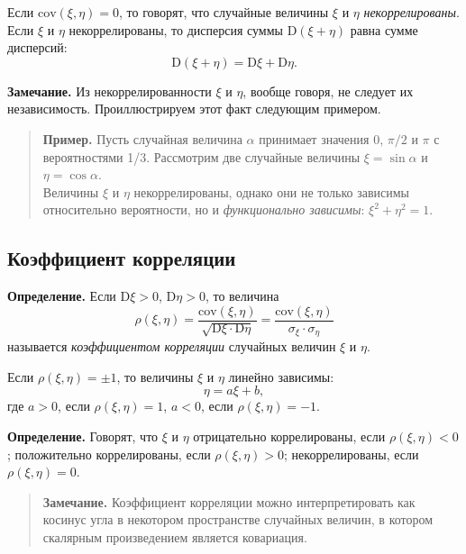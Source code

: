 \documentclass[11pt,a4paper]{article}
\begin{document}
Если \(\mathrm{cov}\left( \xi, \eta \right) = 0\), то говорят, что
случайные величины \(\xi\) и \(\eta\) \emph{некоррелированы}.\\
Если \(\xi\) и \(\eta\) некоррелированы, то дисперсия суммы
\(\mathrm{D}(\xi+\eta)\) равна сумме дисперсий:
\[ \mathrm{D}(\xi+\eta) = \mathrm{D}\xi + \mathrm{D}\eta. \]

\textbf{Замечание.} Из некоррелированности \(\xi\) и \(\eta\), вообще
говоря, не следует их независимость. Проиллюстрируем этот факт следующим
примером.

\begin{quote}
\textbf{Пример.} Пусть случайная величина \(\alpha\) принимает значения
0, \(\pi/2\) и \(\pi\) с вероятностями 1/3. Рассмотрим две случайные
величины \(\xi = \sin \alpha\) и \(\eta = \cos \alpha\).\\
Величины \(\xi\) и \(\eta\) некоррелированы, однако они не только
зависимы относительно вероятности, но и \emph{функционально зависимы}:
\(\xi^2 + \eta^2 = 1\).
\end{quote}

    \hypertarget{ux43aux43eux44dux444ux444ux438ux446ux438ux435ux43dux442-ux43aux43eux440ux440ux435ux43bux44fux446ux438ux438}{%
\subsection{Коэффициент
корреляции}\label{ux43aux43eux44dux444ux444ux438ux446ux438ux435ux43dux442-ux43aux43eux440ux440ux435ux43bux44fux446ux438ux438}}

\textbf{Определение.} Если \(\mathrm{D}\xi > 0\),
\(\mathrm{D}\eta > 0\), то величина \[
    \rho(\xi, \eta) = \dfrac{\mathrm{cov}(\xi, \eta)}{\sqrt{\mathrm{D}\xi \cdot \mathrm{D}\eta}} = \dfrac{\mathrm{cov}(\xi, \eta)}{\sigma_\xi \cdot \sigma_\eta}
\] называется \emph{коэффициентом корреляции} случайных величин \(\xi\)
и \(\eta\).

Если \(\rho(\xi, \eta) = \pm 1\), то величины \(\xi\) и \(\eta\) линейно
зависимы: \[ \eta =a \xi + b, \] где \(a>0\), если
\(\rho(\xi, \eta) = 1\), \(a<0\), если \(\rho(\xi, \eta) = -1\).

\textbf{Определение.} Говорят, что \(\xi\) и \(\eta\) отрицательно
коррелированы, если \(\rho(\xi, \eta) < 0\); положительно коррелированы,
если \(\rho(\xi, \eta) > 0\); некоррелированы, если
\(\rho(\xi, \eta) = 0\).

\begin{quote}
\textbf{Замечание.} Коэффициент корреляции можно интерпретировать как
косинус угла в некотором пространстве случайных величин, в котором
скалярным произведением является ковариация.
\end{quote}
\end{document}
